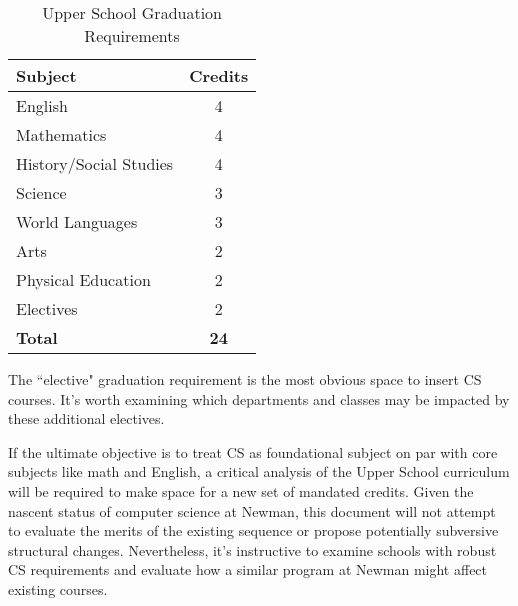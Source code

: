 \begin{table}
	\begin{center}
\begin{tabular}{ | l | c | }
	
	\hline
	\textbf{Subject} & \textbf{Credits} \\ \hline
	English & 4 \\ \hline
	Mathematics & 4 \\ \hline
	History/Social Studies & 4 \\ \hline
	Science & 3 \\ \hline
	World Languages & 3 \\ \hline
	Arts & 2 \\ \hline
	Physical Education & 2 \\ \hline
	Electives & 2 \\ \hline
	\textbf{Total} & \textbf{24} \\ \hline
\end{tabular} 
\caption{Upper School Graduation Requirements} \label{tab:usreqs} 
\end{center}
\end{table}
\par
The ``elective" graduation requirement is the most obvious space to insert CS courses. It's worth examining which departments and classes may be impacted by these additional electives.\par
If the ultimate objective is to treat CS as foundational subject on par with core subjects like math and English, a critical analysis of the Upper School curriculum will be required to make space for a new set of mandated credits. Given the nascent status of computer science at Newman, this document will not attempt to evaluate the merits of the existing sequence or propose potentially subversive structural changes. Nevertheless, it's instructive to examine schools with robust CS requirements and evaluate how a similar program at Newman might affect existing courses.\par



